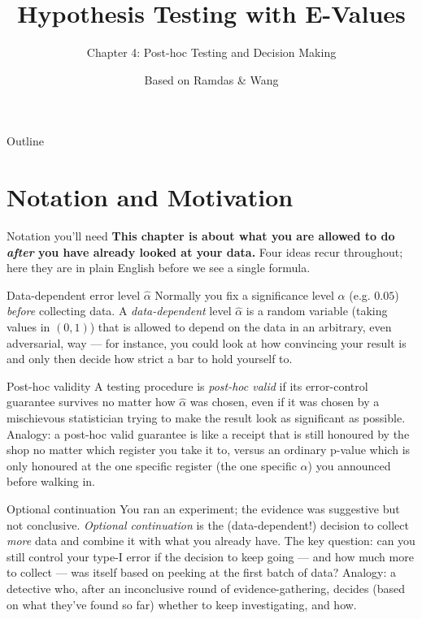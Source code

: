 \documentclass[aspectratio=169,10pt]{beamer}
\title[E-Values -- Ch.4]{Hypothesis Testing with E-Values}
\subtitle{Chapter 4: Post-hoc Testing and Decision Making}
\author{Based on Ramdas \& Wang}
\date{}
\begin{document}
\begin{frame}
  \titlepage
\end{frame}

\begin{frame}{Outline}
  \tableofcontents
\end{frame}

\section*{Notation and Motivation}

\begin{frame}[allowframebreaks]{Notation you'll need}
  \textbf{This chapter is about what you are allowed to do \emph{after} you have
  already looked at your data.} Four ideas recur throughout; here they are in
  plain English before we see a single formula.

  \begin{block}{Data-dependent error level $\hat\alpha$}
    Normally you fix a significance level $\alpha$ (e.g. $0.05$) \emph{before}
    collecting data. A \emph{data-dependent} level $\hat\alpha$ is a random
    variable (taking values in $(0,1)$) that is allowed to depend on the data
    in an arbitrary, even adversarial, way --- for instance, you could look at
    how convincing your result is and only then decide how strict a bar to
    hold yourself to.
  \end{block}

  \begin{block}{Post-hoc validity}
    A testing procedure is \emph{post-hoc valid} if its error-control guarantee
    survives no matter how $\hat\alpha$ was chosen, even if it was chosen
    by a mischievous statistician trying to make the result look as
    significant as possible. Analogy: a post-hoc valid guarantee is like a
    receipt that is still honoured by the shop no matter which register
    you take it to, versus an ordinary p-value which is only honoured at the
    one specific register (the one specific $\alpha$) you announced before
    walking in.
  \end{block}

  \framebreak

  \begin{block}{Optional continuation}
    You ran an experiment; the evidence was suggestive but not conclusive.
    \emph{Optional continuation} is the (data-dependent!) decision to collect
    \emph{more} data and combine it with what you already have. The key
    question: can you still control your type-I error if the decision to
    keep going --- and how much more to collect --- was itself based on
    peeking at the first batch of data? Analogy: a detective who, after an
    inconclusive round of evidence-gathering, decides (based on what they've
    found so far) whether to keep investigating, and how.
  \end{block}


\end{frame}
\end{document}
